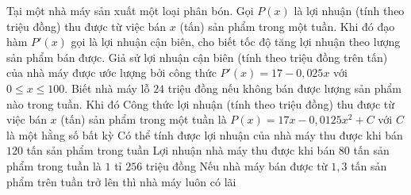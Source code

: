 \begin{ex}%
	Tại một nhà máy sản xuất một loại phân bón. Gọi $P(x)$ là lợi nhuận (tính theo triệu đồng) thu được từ việc bán $x$ (tấn) sản phẩm trong một tuần. Khi đó đạo hàm $P'(x)$ gọi là lợi nhuận cận biên, cho biết tốc độ tăng lợi nhuận theo lượng sản phẩm bán được. Giả sử lợi nhuận cận biên (tính theo triệu đồng trên tấn) của nhà máy được ước lượng bởi công thức $P'(x)=17-0{,}025x$ với $0\le x\le 100$. Biết nhà máy lỗ $24$ triệu đồng nếu không bán được  lượng sản phẩm nào trong tuần. Khi đó
	\choiceTF 
		{Công thức lợi nhuận (tính theo triệu đồng) thu được từ việc bán $x$ (tấn)  sản phẩm trong một tuần là $P(x)=17x-0{,}0125x^2+C$ với $C$ là một hằng số bất kỳ}
		{Có thể tính được lợi nhuận của nhà máy thu  được khi bán $120$ tấn sản phẩm trong tuần}
		{\True Lợi nhuận nhà máy thu được khi bán $80$ tấn sản phẩm trong  tuần là $1$ tỉ $256$ triệu đồng}
		{Nếu nhà  máy bán được từ $1{,}3$ tấn sản phẩm trên tuần trở lên thì nhà máy luôn có lãi}
\end{ex}

